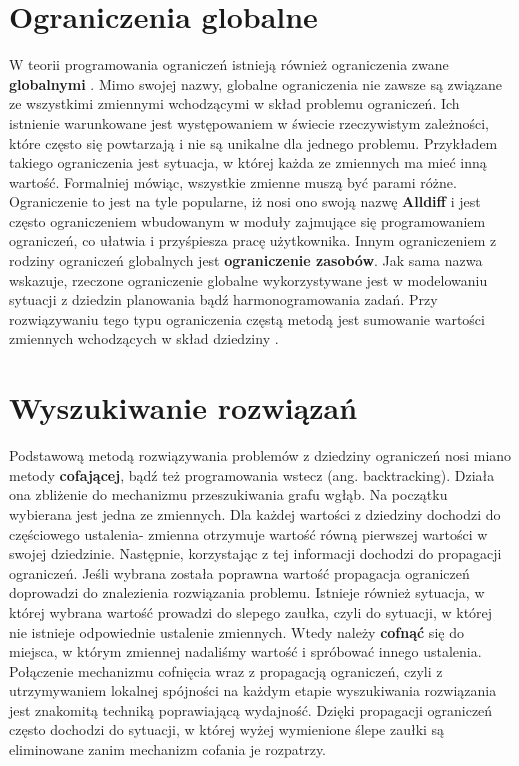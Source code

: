 \section{Ograniczenia globalne}
    W teorii programowania ograniczeń istnieją również ograniczenia zwane \textbf{globalnymi} \cite{CP}. Mimo swojej nazwy, 
    globalne ograniczenia nie zawsze są związane ze wszystkimi zmiennymi wchodzącymi w skład problemu ograniczeń. 
    Ich istnienie warunkowane jest występowaniem w świecie rzeczywistym zależności, które często się powtarzają i nie są 
    unikalne dla jednego problemu. Przykładem takiego ograniczenia jest sytuacja, w której każda ze zmiennych ma mieć inną wartość.
    Formalniej mówiąc, wszystkie zmienne muszą być parami różne. Ograniczenie to jest na tyle popularne, iż nosi ono swoją nazwę 
    \textbf{Alldiff} i jest często ograniczeniem wbudowanym w moduły zajmujące się programowaniem ograniczeń, co ułatwia i przyśpiesza 
    pracę użytkownika. Innym ograniczeniem z rodziny ograniczeń globalnych jest \textbf{ograniczenie zasobów}. Jak sama nazwa wskazuje, 
    rzeczone ograniczenie globalne wykorzystywane jest w modelowaniu sytuacji z dziedzin planowania bądź harmonogramowania zadań. 
    Przy rozwiązywaniu tego typu ograniczenia częstą metodą jest sumowanie wartości zmiennych wchodzących w skład dziedziny \cite{AI}.
    
    
\section{Wyszukiwanie rozwiązań}
    Podstawową metodą rozwiązywania problemów z dziedziny ograniczeń nosi miano metody \textbf{cofającej}, bądź też programowania wstecz (ang. backtracking).
    Działa ona zbliżenie do mechanizmu przeszukiwania grafu wgłąb. Na początku wybierana jest jedna ze zmiennych. Dla każdej wartości 
    z dziedziny dochodzi do częściowego ustalenia- zmienna otrzymuje wartość równą pierwszej wartości w swojej dziedzinie. Następnie, 
    korzystając z tej informacji dochodzi do propagacji ograniczeń. Jeśli wybrana została poprawna wartość propagacja ograniczeń doprowadzi 
    do znalezienia rozwiązania problemu. Istnieje również sytuacja, w której wybrana wartość prowadzi do slepego zaułka, czyli do sytuacji, w której 
    nie istnieje odpowiednie ustalenie zmiennych. Wtedy należy \textbf{cofnąć} 
    się do miejsca, w którym zmiennej nadaliśmy wartość i spróbować innego ustalenia. 
    Połączenie mechanizmu cofnięcia wraz z propagacją ograniczeń, czyli z utrzymywaniem lokalnej spójności na każdym etapie 
    wyszukiwania rozwiązania jest znakomitą techniką poprawiającą wydajność. Dzięki propagacji ograniczeń często 
    dochodzi do sytuacji, w której wyżej wymienione ślepe zaułki są eliminowane zanim mechanizm cofania je rozpatrzy. 
    
